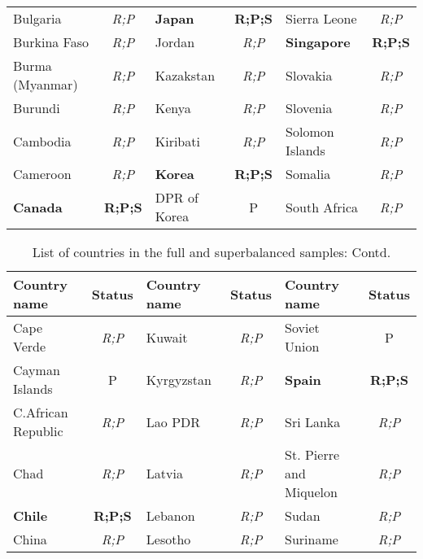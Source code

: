 \documentclass[12pt,twoside,a4paper,notitlepage]{article}
\begin{document}
{\begin{table}
\begin{tabular}{|l|c|l|c|l|c|}
  Bulgaria &  {\it R;P} &   \bf Japan &  {\bf R;P;S} & Sierra Leone &  {\it R;P} \\
  
Burkina Faso &  {\it R;P} &     Jordan &  {\it R;P} & \bf Singapore &  {\bf R;P;S} \\

 Burma (Myanmar)   & {\it R;P}  &  Kazakstan &  {\it R;P} &   Slovakia &  {\it R;P} \\

   Burundi &  {\it R;P} &      Kenya &  {\it R;P} &   Slovenia &  {\it R;P} \\
  
  Cambodia &  {\it R;P} &   Kiribati &  {\it R;P} & Solomon Islands &  {\it R;P} \\

  Cameroon &  {\it R;P} &   \bf Korea &  {\bf R;P;S} &    Somalia &  {\it R;P} \\

  \bf Canada &  {\bf R;P;S} & DPR of Korea &          P & South Africa &  {\it R;P} \\
\hline
\end{tabular}    
\end{table}

\begin{table}
\caption {List of countries in the full and superbalanced samples: Contd.
\label{tab:list2}} 
\begin{tabular}{|l|c|l|c|l|c|}
\hline
{\bf Country name} & {\bf Status} & {\bf Country name} & {\bf Status} & {\bf Country name} & {\bf Status } \\
\hline
Cape Verde &  {\it R;P} &     Kuwait &  {\it R;P} & Soviet Union &          P \\

Cayman Islands &          P & Kyrgyzstan &  {\it R;P} &   \bf  Spain &  {\bf R;P;S} \\

C.African Republic &  {\it R;P} &    Lao PDR &  {\it R;P} &  Sri Lanka &  {\it R;P} \\

 Chad &  {\it R;P} &     Latvia &  {\it R;P} & St.
Pierre and Miquelon &  {\it R;P} \\

   \bf Chile &  {\bf R;P;S} &    Lebanon &  {\it R;P} &      Sudan &  {\it R;P} \\
   
 China &  {\it R;P} &    Lesotho &  {\it R;P} &   Suriname &  {\it R;P} \\


\end{tabular}
\end{table}}
\end{document}
